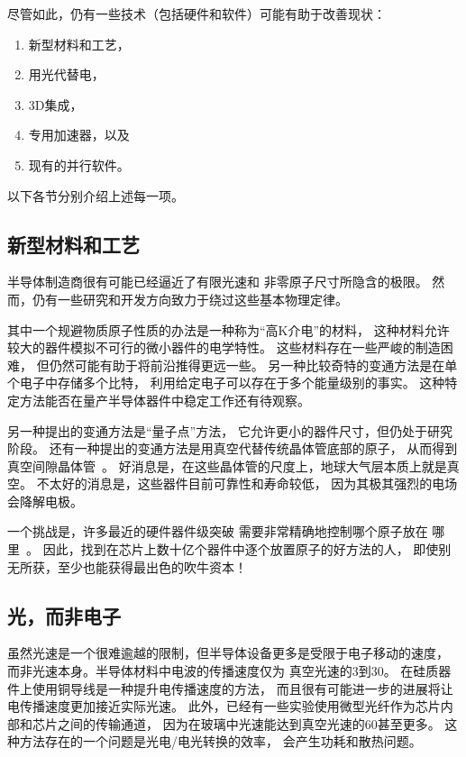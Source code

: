 尽管如此，仍有一些技术（包括硬件和软件）可能有助于改善现状：

\begin{enumerate}
\item	新型材料和工艺，
\item	用光代替电，
\item	3D集成，
\item	专用加速器，以及
\item	现有的并行软件。
\end{enumerate}

以下各节分别介绍上述每一项。

\subsection{新型材料和工艺}
\label{sec:cpu:Novel Materials and Processes}

半导体制造商很有可能已经逼近了有限光速和
非零原子尺寸所隐含的极限。
然而，仍有一些研究和开发方向致力于绕过这些基本物理定律。

其中一个规避物质原子性质的办法是一种称为``高K介电''的材料，
这种材料允许较大的器件模拟不可行的微小器件的电学特性。
这些材料存在一些严峻的制造困难，
但仍然可能有助于将前沿推得更远一些。
另一种比较奇特的变通方法是在单个电子中存储多个比特，
利用给定电子可以存在于多个能量级别的事实。
这种特定方法能否在量产半导体器件中稳定工作还有待观察。

另一种提出的变通方法是``量子点''方法，
它允许更小的器件尺寸，但仍处于研究阶段。
还有一种提出的变通方法是用真空代替传统晶体管底部的原子，
从而得到真空间隙晶体管~\cite{JinWooHan2014VacuumGapTransistor}。
好消息是，在这些晶体管的尺度上，地球大气层本质上就是真空。
不太好的消息是，这些器件目前可靠性和寿命较低，
因为其极其强烈的电场会降解电极。

一个挑战是，许多最近的硬件器件级突破
需要非常精确地控制哪个原子放在
哪里~\cite{MichaelJKelly2017DeviceLevel}。
因此，找到在芯片上数十亿个器件中逐个放置原子的好方法的人，
即使别无所获，至少也能获得最出色的吹牛资本！

\subsection{光，而非电子}
\label{sec:cpu:Light; Not Electrons}

虽然光速是一个很难逾越的限制，但半导体设备更多是受限于电子移动的速度，
而非光速本身。半导体材料中电波的传播速度仅为
真空光速的3\pct 到30\pct。
在硅质器件上使用铜导线是一种提升电传播速度的方法，
而且很有可能进一步的进展将让电传播速度更加接近实际光速。
此外，已经有一些实验使用微型光纤作为芯片内部和芯片之间的传输通道，
因为在玻璃中光速能达到真空光速的60\pct 甚至更多。
这种方法存在的一个问题是光电/电光转换的效率，
会产生功耗和散热问题。

